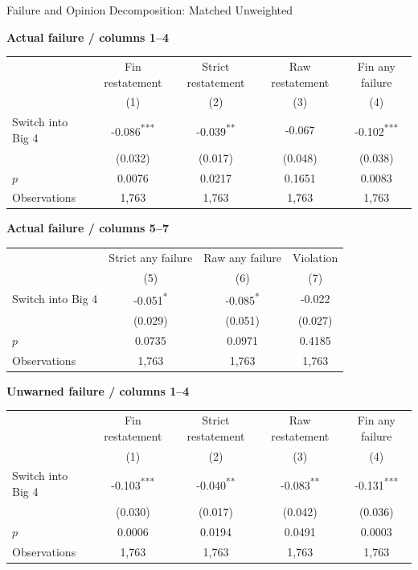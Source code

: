 \documentclass[10pt]{article}
\newcommand{\sym}[1]{\textsuperscript{#1}}
\begin{document}
\fontsize{10}{12}\selectfont
\setlength{\tabcolsep}{3pt}\renewcommand{\arraystretch}{1.15}
\begin{center}\large Failure and Opinion Decomposition: Matched Unweighted\end{center}
\medskip\textbf{Actual failure / columns 1--4}\par\smallskip
\begin{tabular*}{\textwidth}{@{\extracolsep{\fill}}lcccc@{}}
\toprule
 & Fin restatement & Strict restatement & Raw restatement & Fin any failure \\
 & (1) & (2) & (3) & (4) \\
\midrule
Switch into Big 4 & -0.086\sym{***} & -0.039\sym{**} & -0.067 & -0.102\sym{***} \\
 & (0.032) & (0.017) & (0.048) & (0.038) \\
$p$ & 0.0076 & 0.0217 & 0.1651 & 0.0083 \\
Observations & 1,763 & 1,763 & 1,763 & 1,763 \\
\bottomrule\end{tabular*}\par
\medskip\textbf{Actual failure / columns 5--7}\par\smallskip
\begin{tabular*}{\textwidth}{@{\extracolsep{\fill}}lccc@{}}
\toprule
 & Strict any failure & Raw any failure & Violation \\
 & (5) & (6) & (7) \\
\midrule
Switch into Big 4 & -0.051\sym{*} & -0.085\sym{*} & -0.022 \\
 & (0.029) & (0.051) & (0.027) \\
$p$ & 0.0735 & 0.0971 & 0.4185 \\
Observations & 1,763 & 1,763 & 1,763 \\
\bottomrule\end{tabular*}\par
\medskip\textbf{Unwarned failure / columns 1--4}\par\smallskip
\begin{tabular*}{\textwidth}{@{\extracolsep{\fill}}lcccc@{}}
\toprule
 & Fin restatement & Strict restatement & Raw restatement & Fin any failure \\
 & (1) & (2) & (3) & (4) \\
\midrule
Switch into Big 4 & -0.103\sym{***} & -0.040\sym{**} & -0.083\sym{**} & -0.131\sym{***} \\
 & (0.030) & (0.017) & (0.042) & (0.036) \\
$p$ & 0.0006 & 0.0194 & 0.0491 & 0.0003 \\
Observations & 1,763 & 1,763 & 1,763 & 1,763 \\
\bottomrule\end{tabular*}\par
\end{document}
